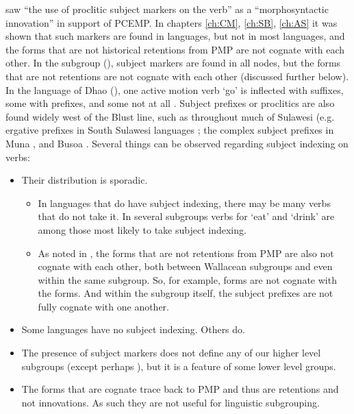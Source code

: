 \citet[258]{Blust1993} saw “the use of proclitic subject markers
on the verb” as a “morphosyntactic innovation” in support of PCEMP.
In chapters \ref{ch:CM}, \ref{ch:SB}, \ref{ch:AS}
it was shown that such markers are found in 
languages, but not in most  languages,
and the forms that are not historical retentions from PMP are
not cognate with each other.
In the  subgroup (),
subject markers are found in all nodes,
but the forms that are not retentions are not cognate with each
other (discussed further below).
In the  language of Dhao (),
one active motion verb ‘go’ is inflected with suffixes,
some with prefixes, and some not at all \citep{Grimes2010a}.
Subject prefixes or proclitics are also found widely west of
the Blust line, such as throughout much of Sulawesi (e.g.
ergative prefixes in South Sulawesi languages \citep{Friberg1991};
the complex subject prefixes in Muna \citep{vandenBerg1989},
and Busoa \citep[54ff]{vandenBerg2020}.
Several things can be observed regarding subject indexing on
verbs:

\begin{itemize}
\item	Their distribution is sporadic.
	\begin{itemize}
		\item	In languages that do have subject indexing,
					there may be many verbs that do not take it.
					In several subgroups verbs for ‘eat’
					and ‘drink’ are among those most likely to take subject indexing.
		\item	As noted in ,
					the forms that are not retentions from PMP are also not cognate
					with each other, both between Wallacean subgroups
					and even within the same subgroup.
					So, for example,  forms
					are not cognate with the  forms.
					And within the  subgroup itself,
					the subject prefixes are not fully cognate with one another.
	\end{itemize}
\item	Some languages have no subject indexing. Others do.
\item	The presence of subject markers does not define any of
			our higher level subgroups (except perhaps ),
			but it is a feature of some lower level groups.
\item	The forms that are cognate trace back to PMP
			and thus are retentions and not innovations.
			As such they are not useful for linguistic subgrouping.
\end{itemize}


